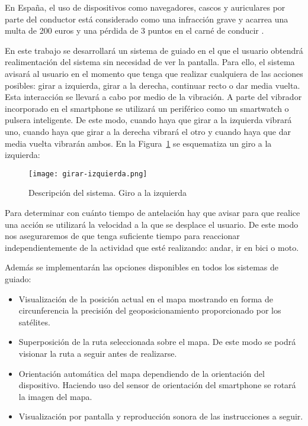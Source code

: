 \documentclass{pre-tfg}
\begin{document}
En España, el uso de dispositivos como navegadores, cascos y auriculares por parte del conductor está considerado como una infracción grave y acarrea una multa de 200 euros y una pérdida de 3 puntos en el carné de conducir \cite{Serrano14} .

En este trabajo se desarrollará un sistema de guiado en el que el usuario obtendrá realimentación del sistema sin necesidad de ver la pantalla. Para ello, el sistema avisará al usuario en el momento que tenga que realizar cualquiera de las acciones posibles: girar a izquierda, girar a la derecha, continuar recto o dar media vuelta. Esta interacción se llevará a cabo por medio de la vibración. A parte del vibrador incorporado en el smartphone se utilizará un periférico como un smartwatch o pulsera inteligente. De este modo, cuando haya que girar a la izquierda vibrará uno, cuando haya que girar a la derecha vibrará el otro y cuando haya que dar media vuelta vibrarán ambos. En la Figura~\ref{fig:descipcion_sistema} se esquematiza un giro a la izquierda:

\begin{figure}[!h]
  \begin{center}
    \texttt{[image: girar-izquierda.png]}
    \caption{Descripción del sistema. Giro a la izquierda}
    \label{fig:descipcion_sistema}
  \end{center}
  \vspace{-25pt}
\end{figure}

Para determinar con cuánto tiempo de antelación hay que avisar para que realice una acción se utilizará la velocidad a la que se desplace el usuario. De este modo nos aseguraremos de que tenga suficiente tiempo para reaccionar independientemente de la actividad que esté realizando: andar, ir en bici o moto.

Además se implementarán las opciones disponibles en todos los sistemas de guiado:

\begin{itemize}
  \item Visualización de la posición actual en el mapa mostrando en forma de circunferencia la precisión del geoposicionamiento proporcionado por los satélites.
  \item Superposición de la ruta seleccionada sobre el mapa. De este modo se podrá visionar la ruta a seguir antes de realizarse.
  \item Orientación automática del mapa dependiendo de la orientación del dispositivo. Haciendo uso del sensor de orientación del smartphone se rotará la imagen del mapa.
  \item Visualización por pantalla y reproducción sonora de las instrucciones a seguir. 
\end{itemize}
\end{document}
